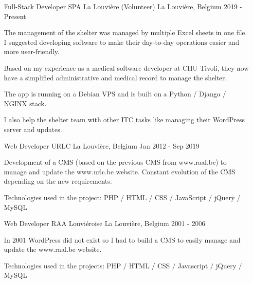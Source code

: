 \begin{cventries}
{    }
    
    
  \cventry
    {Full-Stack Developer} %
    {SPA La Louvière (Volunteer)} %
    {La Louvière, Belgium} %
    {2019 - Present} %
    {
The management of the shelter was managed by multiple Excel sheets in one file.
I suggested developing software to make their day-to-day operations easier and more user-friendly.

Based on my experience as a medical software developer at CHU Tivoli, they now have a simplified administrative and medical record to manage the shelter. 

The app is running on a Debian VPS and is built on a Python / Django / NGINX stack.

I also help the shelter team with other ITC tasks like managing their WordPress server and updates.

    }

  \cventry
    {Web Developer} %
    {URLC} %
    {La Louvière, Belgium} %
    {Jan 2012 - Sep 2019} %
    {
Development of a CMS (based on the previous CMS from www.raal.be) to manage and update the www.urlc.be website. Constant evolution of the CMS depending on the new requirements. 

Technologies used in the project: PHP / HTML / CSS / JavaScript / jQuery / MySQL

    }

  \cventry
    {Web Developer} %
    {RAA Louviéroise} %
    {La Louvière, Belgium} %
    {2001 - 2006} %
    {
In 2001 WordPress did not exist so I had to build a CMS to easily manage and update the www.raal.be website.

Technologies used in the projects: PHP / HTML / CSS / Javascript / jQuery / MySQL

    }
\end{cventries}
